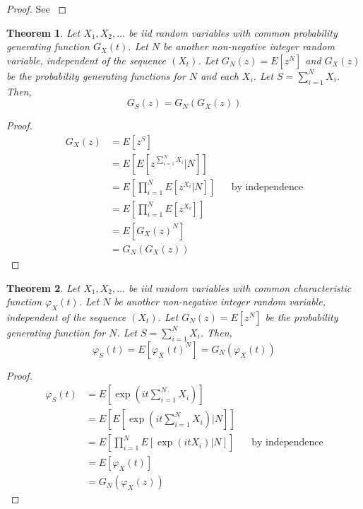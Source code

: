 \documentclass{article}
\theoremstyle{plain}
\newtheorem{theorem}{Theorem}[section]
\theoremstyle{definition}
\theoremstyle{remark}
\begin{document}
\begin{proof}
See \cite{grimmett2001}
\end{proof}



\begin{theorem}\label{thm:generating_random_sum}
Let $X_1, X_2, \ldots$ be iid random variables with common probability generating function $G_X(t)$.
Let $N$ be another non-negative integer random variable, independent of the sequence $(X_t)$.
Let $G_N(z) = E[z^N]$ and $G_X(z)$ be the probability generating functions for $N$ and each $X_i$.
Let $S = \sum_{i = 1}^N X_i$.
Then,
$$
G_S(z) = G_N(G_X(z))
$$
\end{theorem}

\begin{proof}
\begin{align*}
    G_X(z) &= E[ z^S ]\\
    &= E[ E[ z^{\sum_{i = 1}^N X_i} | N ]]\\
    &= E \left[ \prod_{i = 1}^N E[z^{X_i} | N] \right] && \text{by independence}\\
    &= E \left[ \prod_{i = 1}^N E[z^{X_i}] \right]\\
    &= E[ G_X(z)^N]\\
    &= G_N(G_X(z))
\end{align*}
\end{proof}

\begin{theorem}\label{thm:char_func_random_sum}
Let $X_1, X_2, \ldots$ be iid random variables with common characteristic function $\varphi_X(t)$.
Let $N$ be another non-negative integer random variable, independent of the sequence $(X_t)$.
Let $G_N(z) = E[z^N]$ be the probability generating function for $N$.
Let $S = \sum_{i = 1}^N X_i$.
Then,
$$
\varphi_S(t) = E[\varphi_X(t)^N] = G_N(\varphi_X(t))
$$
\end{theorem}

\begin{proof}
\begin{align*}
    \varphi_S(t) &= E[ \exp(it \sum_{i = 1}^N X_i) ]\\
    &= E[ E[ \exp(it \sum_{i = 1}^N X_i) | N ]]\\
    &= E \left[ \prod_{i = 1}^N E[\exp(it X_i) | N] \right] && \text{by independence}\\
    &= E[\varphi_X(t)]\\
    &= G_N(\varphi_X(z))
\end{align*}
\end{proof}
\end{document}
